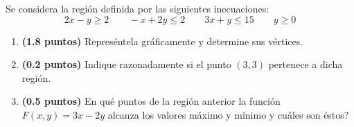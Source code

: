 
Se considera la región definida por las siguientes inecuaciones:
\[
2x-y\geq2\qquad -x+2y\leq2\qquad3x+y\leq15\qquad y\geq0
\]
\begin{enumerate}[label=\alph*)]
\item \textbf{(1.8 puntos)} Represéntela gráficamente y determine sus vértices.
\item \textbf{(0.2 puntos)} Indique razonadamente si el punto $(3,3)$ pertenece a dicha región.
\item \textbf{(0.5 puntos)} \textquestiondown{}En qué puntos de la región anterior la función $F(x,y)=3x-2y$ alcanza los valores máximo y mínimo y cuáles son éstos?
\end{enumerate}
